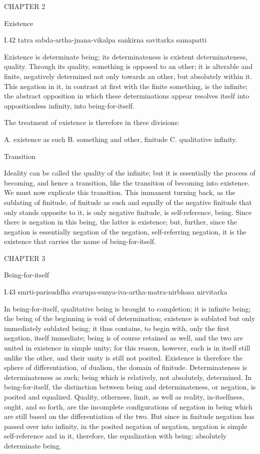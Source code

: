CHAPTER 2

Existence

I.42
tatra sabda-artha-jnana-vikalpa sankirna savitarka samapatti

Existence is determinate being;
its determinateness is existent determinateness, quality.
Through its quality, something is opposed to an other;
it is alterable and finite,
negatively determined not only towards an other,
but absolutely within it.
This negation in it,
in contrast at first
with the finite something,
is the infinite;
the abstract opposition
in which these determinations appear
resolves itself into oppositionless infinity,
into being-for-itself.

The treatment of existence is therefore in three divisions:

A. existence as such
B. something and other, finitude
C. qualitative infinity.

Transition

Ideality can be called the quality of the infinite;
but it is essentially the process of becoming,
and hence a transition, like the transition
of becoming into existence.
We must now explicate this transition.
This immanent turning back, as the sublating of finitude,
of finitude as such and equally of the negative finitude
that only stands opposite to it, is only negative finitude,
is self-reference, being.
Since there is negation in this being, the latter is existence;
but, further, since the negation is essentially
negation of the negation, self-referring negation,
it is the existence that carries the name of being-for-itself.

CHAPTER 3

Being-for-itself

I.43
smrti-parisuddha svarupa-sunya-iva-artha-matra-nirbhasa nirvitarka

In being-for-itself,
qualitative being is brought to completion;
it is infinite being;
the being of the beginning is void of determination;
existence is sublated but only immediately sublated being;
it thus contains, to begin with,
only the first negation, itself immediate;
being is of course retained as well,
and the two are united in existence in simple unity;
for this reason, however, each is in itself still unlike the other,
and their unity is still not posited.
Existence is therefore the sphere of differentiation,
of dualism, the domain of finitude.
Determinateness is determinateness as such;
being which is relatively, not absolutely, determined.
In being-for-itself, the distinction
between being and determinateness,
or negation, is posited and equalized.
Quality, otherness, limit, as well as reality, in-itselfness,
ought, and so forth, are the incomplete configurations of negation in being
which are still based on the differentiation of the two.
But since in finitude negation has passed over into infinity,
in the posited negation of negation,
negation is simple self-reference
and in it, therefore, the equalization with being:
absolutely determinate being.

